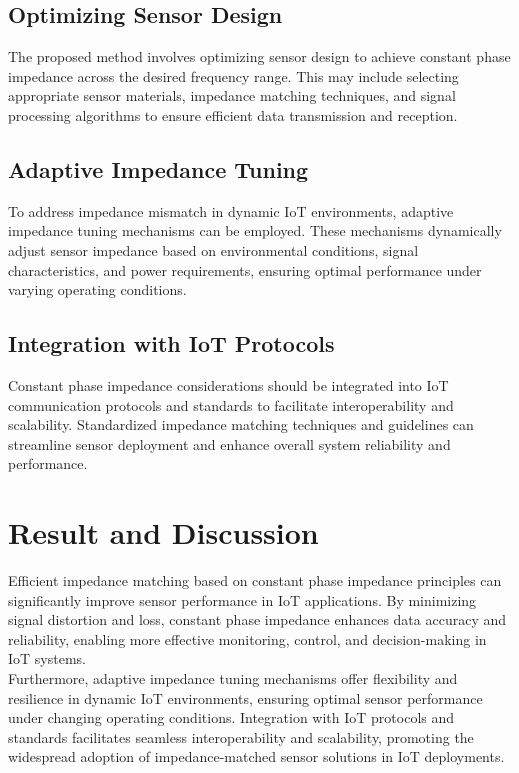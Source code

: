 \documentclass[12pt]{report}
\begin{document}
\subsection*{Optimizing Sensor Design}  The proposed method involves optimizing\cite{internet} sensor design to achieve constant phase impedance across the desired frequency range. This may include selecting appropriate sensor materials, impedance matching techniques, and signal processing algorithms to ensure efficient data transmission and reception.
\subsection*{Adaptive Impedance Tuning}  To address impedance mismatch in dynamic IoT environments, adaptive impedance tuning mechanisms can be employed. These mechanisms dynamically adjust sensor impedance based on environmental conditions, signal characteristics, and power requirements, ensuring optimal performance under varying operating conditions.
\subsection*{Integration with IoT Protocols}  Constant phase impedance considerations should be integrated into IoT communication protocols and standards to facilitate interoperability and scalability. Standardized impedance matching techniques and guidelines can streamline sensor deployment and enhance overall system reliability and performance.\cite{future}




\newpage
\section*{Result and Discussion}
Efficient impedance\cite{future} matching based on constant phase impedance principles can significantly improve sensor performance in IoT applications. By minimizing signal distortion and loss, constant phase impedance enhances data accuracy and reliability, enabling more effective monitoring, control, and decision-making in IoT systems.\\

Furthermore, adaptive impedance tuning mechanisms offer flexibility and resilience in dynamic IoT environments, ensuring optimal sensor performance\cite{define} under changing operating conditions. Integration with IoT protocols and standards facilitates seamless interoperability and scalability, promoting the widespread adoption of impedance-matched sensor solutions in IoT deployments.\\
\end{document}
